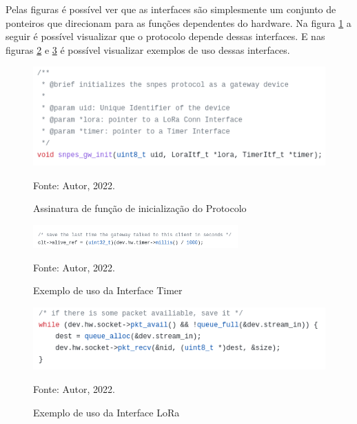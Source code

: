 \newpage

Pelas figuras é possível ver que as interfaces são simplesmente um conjunto
de ponteiros que direcionam para as funções dependentes do hardware. Na figura
\ref{fig:gw-init-def} a seguir é possível visualizar que o protocolo depende dessas interfaces.
E nas figuras \ref{fig:timer-ex} e \ref{fig:lora-ex} é possível visualizar
exemplos de uso dessas interfaces.

\begin{figure}[H]
    \centering
	\caption{Assinatura de função de inicialização do Protocolo}
    \includegraphics[height=0.14\textheight,keepaspectratio]{img/gw-init-def.png}
    \label{fig:gw-init-def}
    
    Fonte: Autor, 2022.
\end{figure}

\begin{figure}[H]
    \centering
	\caption{Exemplo de uso da Interface Timer}
    \includegraphics[width=0.7\textwidth,keepaspectratio]{img/timer-ex.png}
    \label{fig:timer-ex}
    
    Fonte: Autor, 2022.
\end{figure}

\begin{figure}[H]
    \centering
	\caption{Exemplo de uso da Interface LoRa}
    \includegraphics[height=0.09\textheight,keepaspectratio]{img/lora-ex.png}
    \label{fig:lora-ex}
    
    Fonte: Autor, 2022.
\end{figure}

\newpage

